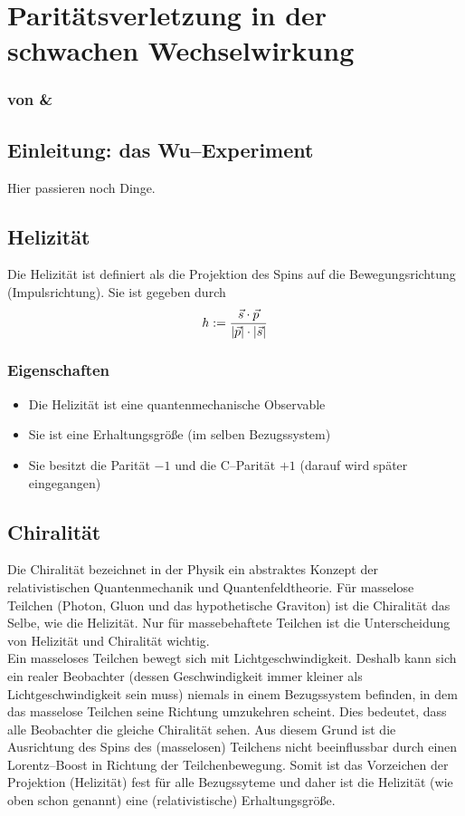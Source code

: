 \documentclass[Ex4_Zusammenfassung.tex]{subfiles}
\begin{document}
\section{Paritätsverletzung in der schwachen Wechselwirkung}
\subsubsection*{von \mitsch \& \anton}

\subsection{Einleitung: das Wu--Experiment}

Hier passieren noch Dinge.

\subsection{Helizität}
Die Helizität ist definiert als die Projektion des Spins auf die Bewegungsrichtung (Impulsrichtung). Sie ist gegeben durch
\begin{equation}
	h:=\frac{\vec{s}\cdot \vec{p}}{\left\vert \vec{p} \right\vert\cdot \left\vert \vec{s} \right\vert}
\end{equation}

\subsubsection{Eigenschaften}
\begin{itemize}
	\item Die Helizität ist eine quantenmechanische Observable
	\item Sie ist eine Erhaltungsgröße (im selben Bezugssystem)
	\item Sie besitzt die Parität $-1$ und die C--Parität $+1$ (darauf wird später eingegangen)
\end{itemize}

\subsection{Chiralität}
Die Chiralität bezeichnet in der Physik ein abstraktes Konzept der relativistischen Quantenmechanik und Quantenfeldtheorie. Für masselose Teilchen (Photon, Gluon und das hypothetische Graviton) ist die Chiralität das Selbe, wie die Helizität. Nur für massebehaftete Teilchen ist die Unterscheidung von Helizität und Chiralität wichtig.\\

Ein masseloses Teilchen bewegt sich mit Lichtgeschwindigkeit. Deshalb kann sich ein realer Beobachter (dessen Geschwindigkeit immer kleiner als Lichtgeschwindigkeit sein muss) niemals in einem Bezugssystem befinden, in dem das masselose Teilchen seine Richtung umzukehren scheint. Dies bedeutet, dass alle Beobachter die gleiche Chiralität sehen. Aus diesem Grund ist die Ausrichtung des Spins des (masselosen) Teilchens nicht beeinflussbar durch einen Lorentz--Boost in Richtung der Teilchenbewegung. Somit ist das Vorzeichen der Projektion (Helizität) fest für alle Bezugssyteme und daher ist die Helizität (wie oben schon genannt) eine (relativistische) Erhaltungsgröße. 
\end{document}
